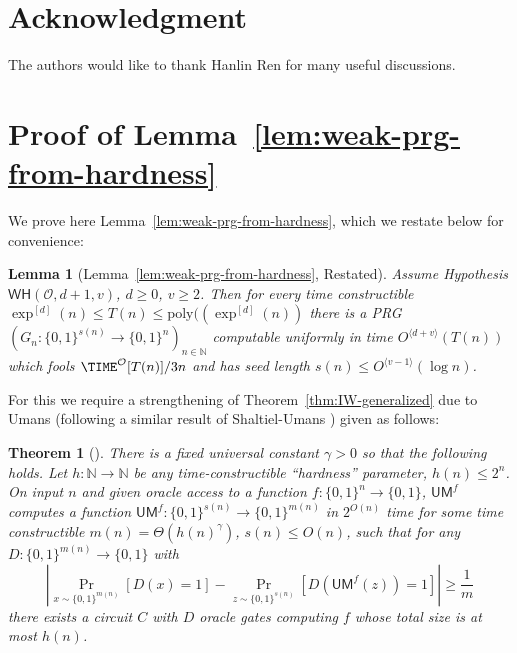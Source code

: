 \documentclass[11pt]{article}
\newtheorem{theorem}{Theorem}
\newtheorem*{lemma*}{Lemma}
\newcommand{\B}{\{0,1\}}
\newcommand{\od}[1]{O^{\langle #1 \rangle}}
\newcommand{\WH}{\mathsf{WH}}
\renewcommand{\poly}{\mathrm{poly}}
\begin{document}
\section*{Acknowledgment}
The authors would like to thank Hanlin Ren for many useful discussions.




\appendix
\section{Proof of Lemma~\ref{lem:weak-prg-from-hardness}}
We prove here Lemma~\ref{lem:weak-prg-from-hardness}, which we restate below for convenience:


\begin{lemma*}[Lemma~\ref{lem:weak-prg-from-hardness}, Restated]
Assume Hypothesis $\WH(\mathcal{O},d+1,v)$, $d\geq 0$, $v \geq 2$. Then for every time constructible $\exp^{[d]}(n)  \leq T(n) \leq \poly((\exp^{[d]}(n))$ there is a PRG $(G_n: \B^{s(n)} \to \B^n)_{n \in \mathbb{N}}$ computable uniformly in time $\od{d+v}(T(n))$ which fools $\TIME^{\mathcal{O}}[T(n)]/3n$ and has seed length $s(n) \leq \od{v-1}(\log n)$. 
\end{lemma*}

For this we require a strengthening of Theorem~\ref{thm:IW-generalized} due to Umans \cite{umans} (following a similar result of Shaltiel-Umans \cite{shaltiel-umans}) given as follows:

\begin{theorem}[\cite{umans}]\label{thm:umans}
There is a fixed universal constant $\gamma > 0$ so that the following holds. Let $h: \mathbb{N} \to \mathbb{N}$ be any time-constructible ``hardness'' parameter, $h(n) \leq 2^n$. On input $n$ and given oracle access to a function $f: \B^{n} \to \B$, $\mathsf{UM}^f$ computes a function $\mathsf{UM}^f: \B^{s(n)} \to \B^{m(n)}$ in $2^{O(n)}$ time for some time constructible $m(n) =\Theta( h(n)^{\gamma})$, $s(n) \leq O(n)$, such that for any $D: \B^{m(n)} \to \B$ with
\[
|\Pr_{x \sim \B^{m(n)}}[ D(x) = 1] - \Pr_{z \sim \B^{s(n)}}[D(\mathsf{UM}^f(z)) = 1]| \geq \frac{1}{m}
\]
there exists a circuit $C$ with $D$ oracle gates computing $f$ whose total size is at most $h(n)$.
\end{theorem}
\end{document}

